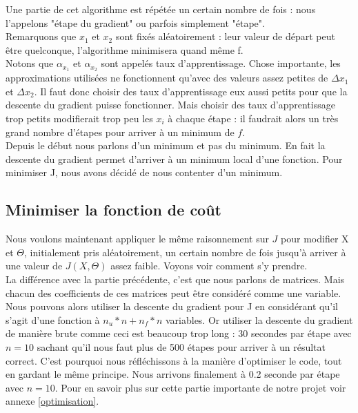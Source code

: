 \documentclass[a4paper,10pt]{article}
\begin{document}
\noindent Une partie de cet algorithme est répétée un certain nombre de fois : nous l'appelons "étape du gradient" ou parfois simplement "étape".\\
Remarquons que $x_1$ et $x_2$ sont fixés aléatoirement : leur valeur de départ peut être quelconque, l'algorithme minimisera quand même f.\\
Notons que $\alpha_{x_1}$ et $\alpha_{x_2}$ sont appelés taux d'apprentissage.
Chose importante, les approximations utilisées ne fonctionnent qu'avec des valeurs assez petites de $\Delta x_1$ et $\Delta x_2$. Il faut donc choisir des taux d'apprentissage eux aussi petits pour que la descente du gradient puisse fonctionner. Mais choisir des taux d'apprentissage trop petits modifierait trop peu les $x_i$ à chaque étape : il faudrait alors un très grand nombre d'étapes pour arriver à un minimum de $f$.\\

Depuis le début nous parlons d'un minimum et pas du minimum. En fait la descente du gradient permet d'arriver à un minimum local d'une fonction. Pour minimiser J, nous avons décidé de nous contenter d'un minimum.

\subsection{Minimiser la fonction de coût}

Nous voulons maintenant appliquer le même raisonnement sur $J$ pour modifier X et $\Theta$, initialement pris aléatoirement, un certain nombre de fois jusqu'à arriver à une valeur de $J(X, \Theta)$ assez faible. Voyons voir comment s'y prendre.\\

La différence avec la partie précédente, c'est que nous parlons de matrices. Mais chacun des coefficients de ces matrices peut être considéré comme une variable. Nous pouvons alors utiliser la descente du gradient pour J en considérant qu'il s'agit d'une fonction à $n_u * n + n_f * n$ variables. Or utiliser la descente du gradient de manière brute comme ceci est beaucoup trop long : 30 secondes par étape avec $n = 10$ sachant qu'il nous faut plus de 500 étapes pour arriver à un résultat correct. C'est pourquoi nous réfléchissons à la manière d'optimiser le code, tout en gardant le même principe. Nous arrivons finalement à 0.2 seconde par étape avec $n = 10$. Pour en savoir plus sur cette partie importante de notre projet voir annexe \ref{optimisation}.\\
\end{document}
